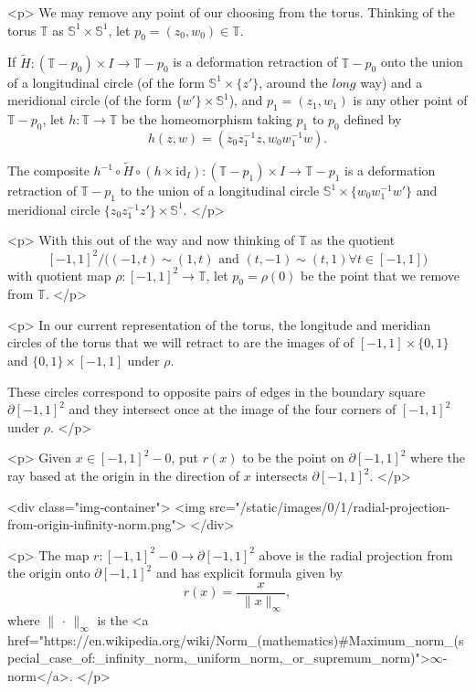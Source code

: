 <p>
    We may remove any point of our choosing from the torus. Thinking of the torus $\mathbb{T}$ as $\mathbb{S}^1 \times
    \mathbb{S}^1$, let $p_0 = (z_0,w_0) \in \mathbb{T}$.

    If $\widetilde{H} : (\mathbb{T} - p_0) \times I \to \mathbb{T}
    - p_0$ is a deformation retraction of $\mathbb{T} - p_0$ onto the union of a longitudinal circle (of the form
    $\mathbb{S}^1 \times \{z'\}$, around the $\textit{long}$ way) and a meridional circle
    (of the form $\{w'\} \times \mathbb{S}^1$), and $p_1 = (z_1, w_1)$ is any other point of $\mathbb{T} - p_0$,
    let $h : \mathbb{T} \to \mathbb{T}$ be the homeomorphism taking $p_1$ to $p_0$ defined by
    $$ h(z,w) = (z_0z_1^{-1}z, w_0w_1^{-1}w). $$

    The composite $h^{-1} \circ \widetilde{H} \circ (h \times \text{id}_I) : (\mathbb{T} - p_1)\times I \to \mathbb{T} -
    p_1$ is a deformation retraction of $\mathbb{T} - p_1$ to the union of a longitudinal circle $\mathbb{S}^1 \times
    \{w_0w_1^{-1}w'\}$ and meridional circle $ \{z_0z_1^{-1}z'\} \times \mathbb{S}^1$.
</p>

<p>
    With this out of the way and now thinking of $\mathbb{T}$ as the quotient
    $$[-1,1]^{2} /\big((-1,t) \sim (1,t) \text{ and } (t,-1) \sim (t,1) \forall t \in [-1,1]\big)$$
    with quotient map $\rho : [-1,1]^2 \to \mathbb{T}$, let $p_0 = \rho(0)$ be the point that we remove from
    $\mathbb{T}$.
</p>

<p>
    In our current representation of the torus, the longitude and meridian circles of the torus that we will retract to
    are the images of of $[-1,1] \times \{0,1\}$ and $\{0,1\} \times [-1,1]$ under $\rho$.

    These circles correspond to opposite pairs of edges in the boundary square $\partial [-1,1]^{2}$ and they intersect
    once at the image of the four corners of $[-1,1]^{2}$ under $\rho$.
</p>

<p>
    Given $x \in [-1,1]^{2}- 0$, put $r(x)$ to be the point on $\partial [-1,1]^{2}$ where the ray based at
    the origin in the direction of $x$ intersects $\partial [-1,1]^{2}$.
</p>

<div class="img-container">
    <img src="/static/images/0/1/radial-projection-from-origin-infinity-norm.png">
</div>

<p>
    The map $r : [-1,1]^{2} - 0 \to \partial [-1,1]^{2}$ above is the radial projection from the origin onto
    $\partial [-1,1]^{2}$ and has explicit formula given by
    $$r(x) = \frac{x}{\,\,\lVert x \rVert_{\infty}},$$
    where $\lVert \, \cdot \, \rVert_{\infty}$ is the
    <a
        href="https://en.wikipedia.org/wiki/Norm_(mathematics)#Maximum_norm_(special_case_of:_infinity_norm,_uniform_norm,_or_supremum_norm)">$\infty$-norm</a>.
</p>

